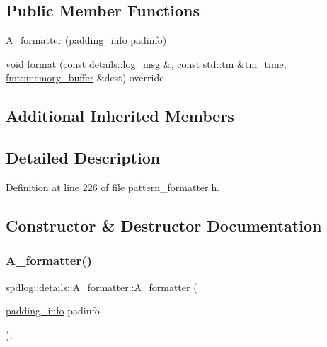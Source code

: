 \subsection*{Public Member Functions}
\begin{DoxyCompactItemize}
\item 
\hyperlink{classspdlog_1_1details_1_1_a__formatter_aaa0b668428ff16e07a5258575b711955}{A\+\_\+formatter} (\hyperlink{structspdlog_1_1details_1_1padding__info}{padding\+\_\+info} padinfo)
\item 
void \hyperlink{classspdlog_1_1details_1_1_a__formatter_a4df40ed70fbad25284e8479aefa680bb}{format} (const \hyperlink{structspdlog_1_1details_1_1log__msg}{details\+::log\+\_\+msg} \&, const std\+::tm \&tm\+\_\+time, \hyperlink{format_8h_a21cbf729f69302f578e6db21c5e9e0d2}{fmt\+::memory\+\_\+buffer} \&dest) override
\end{DoxyCompactItemize}
\subsection*{Additional Inherited Members}


\subsection{Detailed Description}


Definition at line 226 of file pattern\+\_\+formatter.\+h.



\subsection{Constructor \& Destructor Documentation}
\mbox{\label{classspdlog_1_1details_1_1_a__formatter_aaa0b668428ff16e07a5258575b711955}} 
\subsubsection{\texorpdfstring{A\+\_\+formatter()}{A\_formatter()}}
{\footnotesize\ttfamily spdlog\+::details\+::\+A\+\_\+formatter\+::\+A\+\_\+formatter (\begin{DoxyParamCaption}\item[{\hyperlink{structspdlog_1_1details_1_1padding__info}{padding\+\_\+info}}]{padinfo }\end{DoxyParamCaption})\hspace{0.3cm}{\ttfamily [inline]}, {\ttfamily [explicit]}}



